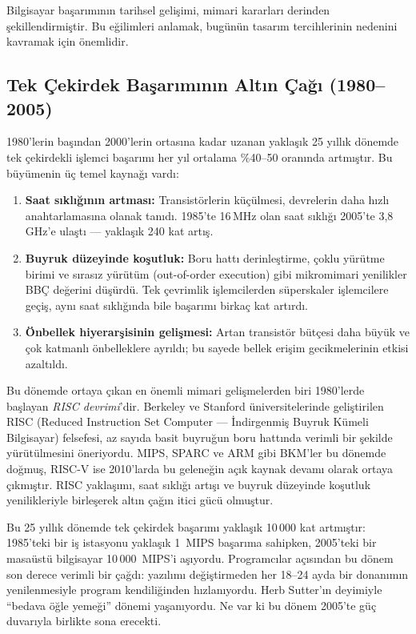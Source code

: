 Bilgisayar başarımının tarihsel gelişimi, mimari kararları derinden şekillendirmiştir. Bu eğilimleri anlamak, bugünün tasarım tercihlerinin nedenini kavramak için önemlidir.

\subsection{Tek Çekirdek Başarımının Altın Çağı (1980--2005)}
\label{subsec:altin-cag}

1980'lerin başından 2000'lerin ortasına kadar uzanan yaklaşık 25 yıllık dönemde tek çekirdekli işlemci başarımı her yıl ortalama \%40--50 oranında artmıştır. Bu büyümenin üç temel kaynağı vardı:

\begin{enumerate}
    \item \textbf{Saat sıklığının artması:} Transistörlerin küçülmesi, devrelerin daha hızlı anahtarlamasına olanak tanıdı. 1985'te 16\,MHz olan saat sıklığı 2005'te 3,8\,GHz'e ulaştı --- yaklaşık 240 kat artış.

    \item \textbf{Buyruk düzeyinde koşutluk:} Boru hattı derinleştirme, çoklu yürütme birimi ve sırasız yürütüm (out-of-order execution) gibi mikromimari yenilikler BBÇ değerini düşürdü. Tek çevrimlik işlemcilerden süperskaler işlemcilere geçiş, aynı saat sıklığında bile başarımı birkaç kat artırdı.

    \item \textbf{Önbellek hiyerarşisinin gelişmesi:} Artan transistör bütçesi daha büyük ve çok katmanlı önbelleklere ayrıldı; bu sayede bellek erişim gecikmelerinin etkisi azaltıldı.
\end{enumerate}

Bu dönemde ortaya çıkan en önemli mimari gelişmelerden biri 1980'lerde başlayan \emph{RISC devrimi}'dir. Berkeley ve Stanford üniversitelerinde geliştirilen RISC (Reduced Instruction Set Computer --- İndirgenmiş Buyruk Kümeli Bilgisayar) felsefesi, az sayıda basit buyruğun boru hattında verimli bir şekilde yürütülmesini öneriyordu. MIPS, SPARC ve ARM gibi BKM'ler bu dönemde doğmuş, RISC-V ise 2010'larda bu geleneğin açık kaynak devamı olarak ortaya çıkmıştır. RISC yaklaşımı, saat sıklığı artışı ve buyruk düzeyinde koşutluk yenilikleriyle birleşerek altın çağın itici gücü olmuştur.

Bu 25 yıllık dönemde tek çekirdek başarımı yaklaşık 10\,000 kat artmıştır: 1985'teki bir iş istasyonu yaklaşık 1~MIPS başarıma sahipken, 2005'teki bir masaüstü bilgisayar 10\,000~MIPS'i aşıyordu. Programcılar açısından bu dönem son derece verimli bir çağdı: yazılımı değiştirmeden her 18--24 ayda bir donanımın yenilenmesiyle program kendiliğinden hızlanıyordu. Herb Sutter'ın deyimiyle ``bedava öğle yemeği'' dönemi yaşanıyordu. Ne var ki bu dönem 2005'te güç duvarıyla birlikte sona erecekti.

